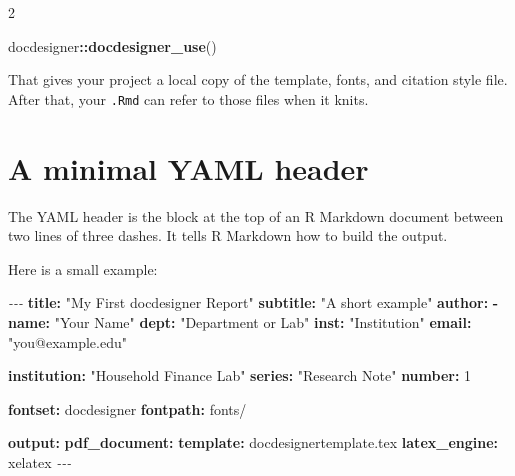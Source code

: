 \documentclass[12pt]{article}
\newenvironment{Shaded}{\begin{snugshade}}{\end{snugshade}}
\newcommand{\AttributeTok}[1]{\textcolor[rgb]{0.13,0.29,0.53}{#1}}
\newcommand{\DecValTok}[1]{\textcolor[rgb]{0.00,0.00,0.81}{#1}}
\newcommand{\FunctionTok}[1]{\textcolor[rgb]{0.13,0.29,0.53}{\textbf{#1}}}
\newcommand{\KeywordTok}[1]{\textcolor[rgb]{0.13,0.29,0.53}{\textbf{#1}}}
\newcommand{\NormalTok}[1]{#1}
\newcommand{\PreprocessorTok}[1]{\textcolor[rgb]{0.56,0.35,0.01}{\textit{#1}}}
\newcommand{\SpecialCharTok}[1]{\textcolor[rgb]{0.81,0.36,0.00}{\textbf{#1}}}
\newcommand{\StringTok}[1]{\textcolor[rgb]{0.31,0.60,0.02}{#1}}
\renewenvironment{Shaded}{%
    \vspace{3pt}%
    \noindent\begin{minipage}{\linewidth}%
    \def\FrameCommand{%
      \hspace{1pt}%
      {\color{docdesignerrule}\vrule width 3pt}%
      \hspace{4pt}%
      \colorbox{codeinputbg}%
    }%
    \MakeFramed{\advance\hsize by -\width \FrameRestore}%
    \footnotesize
    \setlength{\parskip}{0pt}%
    \setlength{\partopsep}{0pt}%
  }{%
    \endMakeFramed
    \end{minipage}%
    \vspace{3pt}%
  }
\def\FrameCommand{\fboxsep=4pt\colorbox{codeoutputbg}}%
\begin{document}
\begin{multicols}{2}
\begin{Shaded}
\begin{Highlighting}[]
\NormalTok{docdesigner}\SpecialCharTok{::}\FunctionTok{docdesigner\_use}\NormalTok{()}
\end{Highlighting}
\end{Shaded}

That gives your project a local copy of the template, fonts, and
citation style file. After that, your \texttt{.Rmd} can refer to those
files when it knits.

\section{A minimal YAML header}\label{a-minimal-yaml-header}

The YAML header is the block at the top of an R Markdown document
between two lines of three dashes. It tells R Markdown how to build the
output.

Here is a small example:

\begin{Shaded}
\begin{Highlighting}[]
\PreprocessorTok{{-}{-}{-}}
\FunctionTok{title}\KeywordTok{:}\AttributeTok{ }\StringTok{"My First docdesigner Report"}
\FunctionTok{subtitle}\KeywordTok{:}\AttributeTok{ }\StringTok{"A short example"}
\FunctionTok{author}\KeywordTok{:}
\AttributeTok{  }\KeywordTok{{-}}\AttributeTok{ }\FunctionTok{name}\KeywordTok{:}\AttributeTok{ }\StringTok{"Your Name"}
\AttributeTok{    }\FunctionTok{dept}\KeywordTok{:}\AttributeTok{ }\StringTok{"Department or Lab"}
\AttributeTok{    }\FunctionTok{inst}\KeywordTok{:}\AttributeTok{ }\StringTok{"Institution"}
\AttributeTok{    }\FunctionTok{email}\KeywordTok{:}\AttributeTok{ }\StringTok{"you@example.edu"}

\FunctionTok{institution}\KeywordTok{:}\AttributeTok{ }\StringTok{"Household Finance Lab"}
\FunctionTok{series}\KeywordTok{:}\AttributeTok{ }\StringTok{"Research Note"}
\FunctionTok{number}\KeywordTok{:}\AttributeTok{ }\DecValTok{1}

\FunctionTok{fontset}\KeywordTok{:}\AttributeTok{ docdesigner}
\FunctionTok{fontpath}\KeywordTok{:}\AttributeTok{ fonts/}

\FunctionTok{output}\KeywordTok{:}
\AttributeTok{  }\FunctionTok{pdf\_document}\KeywordTok{:}
\AttributeTok{    }\FunctionTok{template}\KeywordTok{:}\AttributeTok{ docdesignertemplate.tex}
\AttributeTok{    }\FunctionTok{latex\_engine}\KeywordTok{:}\AttributeTok{ xelatex}
\PreprocessorTok{{-}{-}{-}}
\end{Highlighting}
\end{Shaded}


\end{multicols}
\end{document}

